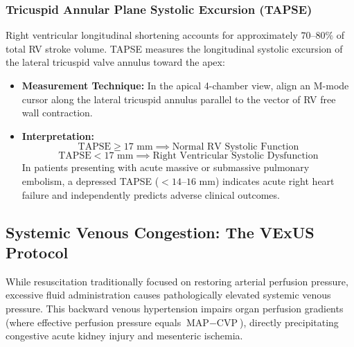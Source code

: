\documentclass[11pt,a4paper]{article}
\begin{document}
\subsubsection{Tricuspid Annular Plane Systolic Excursion (TAPSE)}
Right ventricular longitudinal shortening accounts for approximately $70\text{--}80\%$ of total RV stroke volume. TAPSE measures the longitudinal systolic excursion of the lateral tricuspid valve annulus toward the apex:
\begin{itemize}[leftmargin=2em]
    \item \textbf{Measurement Technique:} In the apical 4-chamber view, align an M-mode cursor along the lateral tricuspid annulus parallel to the vector of RV free wall contraction.
    \item \textbf{Interpretation:}
    \begin{equation}
        \text{TAPSE} \ge 17\text{ mm} \implies \text{Normal RV Systolic Function}
    \end{equation}
    \begin{equation}
        \text{TAPSE} < 17\text{ mm} \implies \text{Right Ventricular Systolic Dysfunction}
    \end{equation}
    In patients presenting with acute massive or submassive pulmonary embolism, a depressed TAPSE ($< 14\text{--}16\text{ mm}$) indicates acute right heart failure and independently predicts adverse clinical outcomes.
\end{itemize}

\subsection{Systemic Venous Congestion: The VExUS Protocol}
While resuscitation traditionally focused on restoring arterial perfusion pressure, excessive fluid administration causes pathologically elevated systemic venous pressure. This backward venous hypertension impairs organ perfusion gradients (where effective perfusion pressure equals $\text{MAP} - \text{CVP}$), directly precipitating congestive acute kidney injury and mesenteric ischemia.
\end{document}
